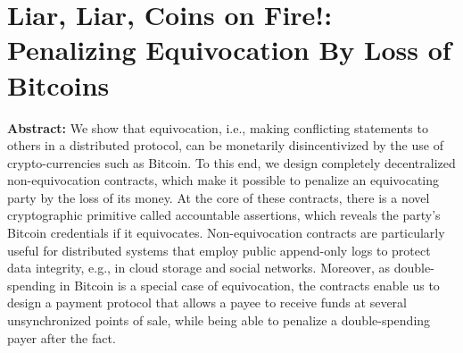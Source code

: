 \section{Liar, Liar, Coins on Fire!: Penalizing Equivocation By Loss of Bitcoins }

\textbf{Abstract:} 
We show that equivocation, i.e., making conflicting statements to others in a distributed protocol, can be monetarily disincentivized by the use of crypto-currencies such as Bitcoin. To this end, we design completely decentralized non-equivocation contracts, which make it possible to penalize an equivocating party by the loss of its money. At the core of these contracts, there is a novel cryptographic primitive called accountable assertions, which reveals the party’s Bitcoin credentials if it equivocates. Non-equivocation contracts are particularly useful for distributed systems that employ public append-only logs to protect data integrity, e.g., in cloud storage and social networks. Moreover, as double-spending in Bitcoin is a special case of equivocation, the contracts enable us to design a payment protocol that allows a payee to receive funds at several unsynchronized points of sale, while being able to penalize a double-spending payer after the fact.
